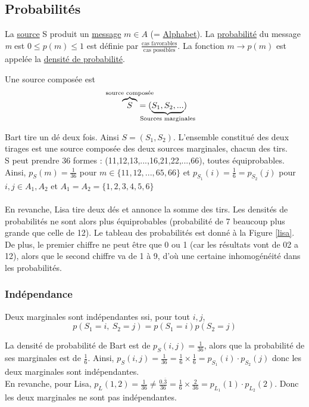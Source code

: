 \documentclass[11pt,a4paper]{article}
\begin{document}
\subsection{Probabilités}
La \uline{source} S produit un  \uline{message} $m\in A$ (= \uline{Alphabet}). La \uline{probabilité} du message \textit{m} est $0\leq {p(m)} \leq 1$ est définie par $ \frac{\text{cas favorables}}{\text{cas possibles}}$. La fonction $m\to p(m)$ est appelée la \uline{densité de probabilité}. 

Une source composée est 
\begin{equation*}
\overbrace{S}^{\mathclap{\text{source composée}}} =(\underbrace{S_1,S_2,...}_{\mathclap{\text{Sources marginales}}})
\end{equation*}
\begin{exemple}
	Bart tire un dé deux fois. Ainsi $S = (S_1,S_2)$. L'ensemble constitué des deux tirages est une source composée des deux sources marginales, chacun des tirs.\\
	S peut prendre 36 formes : (11,12,13,...,16,21,22,...,66), toutes équiprobables. Ainsi, $p_S(m) = \frac{1}{36}$ pour $m \in \{11,12,...,65,66\}$ et $p_{S_1}(i) = \frac{1}{6} = p_{S_2}(j)$ pour $i,j \in A_1,A_2$ et $A_1 = A_2 = \{1,2,3,4,5,6\}$\\
	\\
	En revanche, Lisa tire deux dés et annonce la somme des tirs. Les densités de probabilités ne sont alors plus équiprobables (probabilité de 7 beaucoup plus grande que celle de 12). Le tableau des probabilités est donné à la Figure \ref{lisa}. De plus, le premier chiffre ne peut être que 0 ou 1 (car les résultats vont de 02 a 12), alors que le second chiffre va de 1 à 9, d'où une certaine inhomogénéité dans les probabilités.
\end{exemple}
\subsubsection{Indépendance}
Deux marginales sont indépendantes ssi, pour tout $i,j$,
\begin{equation*}
	p(S_1 = i,\ S_2 = j) = p(S_1=i)p(S_2=j)
\end{equation*}
\begin{exemple}
	La densité de probabilité de Bart est de $p_S(i,j) = \frac{1}{36}$, alors que la probabilité de ses marginales est de $\frac{1}{6}$. Ainsi, $p_S(i,j) = \frac{1}{36} = \frac{1}{6}\times \frac{1}{6} = p_{S_1}(i)\cdot p_{S_2}(j)$ donc les deux marginales sont indépendantes.\\
	En revanche, pour Lisa, $p_L(1,2) = \frac{1}{36} \neq \frac{0.\overline{3}}{36} = \frac{1}{6}\times \frac{2}{36} = p_{L_1}(1)\cdot p_{L_2}(2)$. Donc les deux marginales ne sont pas indépendantes.
\end{exemple}
\end{document}
